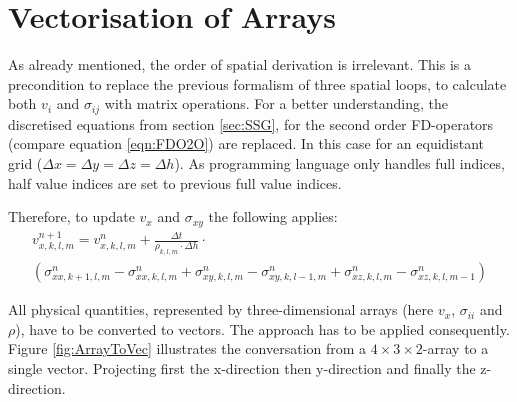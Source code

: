 \documentclass[pdftex,a4paper,parskip,listof=totoc,bibliography=totoc,onehalfspacing,12pt]{scrreprt}
\begin{document}
\section{Vectorisation of Arrays}
As already mentioned, the order of spatial derivation is irrelevant. This is a precondition to replace the previous formalism of three spatial loops, to calculate both $v_i$ and $\sigma_{ij}$ with matrix operations. For a better understanding, the discretised equations from section \ref{sec:SSG}, for the second order FD-operators (compare equation \ref{eqn:FDO2O}) are replaced. In this case for an equidistant grid ($\Delta x = \Delta y = \Delta z = \Delta h$). As programming language only handles full indices, half value indices are set to previous full value indices. 

Therefore, to update $v_x$ and $\sigma_{xy}$  the following applies:
\begin{multline}
	v_{x,k,l,m}^{n+1} = v_{x,k,l,m}^n + \frac{\Delta t}{\rho_{k,l,m} \cdot \Delta h} \cdot\\  \left( \sigma_{xx,k+1,l,m}^{n} - \sigma_{xx,k,l,m}^{n} + \sigma_{xy,k,l,m}^{n} - \sigma_{xy,k,l-1,m}^{n} + \sigma_{xz,k,l,m}^{n} - \sigma_{xz,k,l,m-1}^{n} \right)\label{eqn:exMV1}
\end{multline}

All physical quantities, represented by three-dimensional arrays (here $v_x$, $\sigma_{ii}$ and $\rho$), have to be converted to vectors. The approach has to be applied consequently. Figure \ref{fig:ArrayToVec} illustrates the conversation from a $4 \times 3 \times 2$-array to a single vector. Projecting first the x-direction then y-direction and finally the z-direction.
\end{document}
